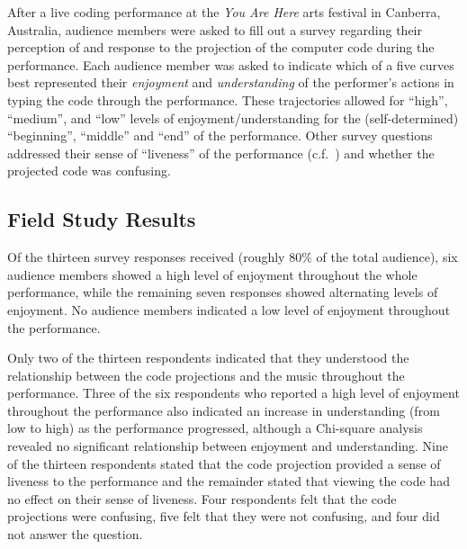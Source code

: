 \documentclass{sig-alternate}
\begin{document}


After a live coding performance at the \emph{You Are Here} arts
festival in Canberra, Australia, audience members were asked to fill
out a survey regarding their perception of and response to the
projection of the computer code during the performance. Each audience
member was asked to indicate which of a five curves best represented
their \emph{enjoyment} and \emph{understanding} of the performer's
actions in typing the code through the performance. These trajectories
allowed for ``high'', ``medium'', and ``low'' levels of
enjoyment/understanding for the (self-determined) ``beginning'',
``middle'' and ``end'' of the performance. Other survey questions
addressed their sense of ``liveness'' of the performance
(c.f.~\cite{Auslander}) and whether the projected code was confusing.

\subsection{Field Study Results}

Of the thirteen survey responses received (roughly $80\%$ of the total
audience), six audience members showed a high level of enjoyment
throughout the whole performance, while the remaining seven responses
showed alternating levels of enjoyment. No audience members indicated
a low level of enjoyment throughout the performance.

Only two of the thirteen respondents indicated that they understood
the relationship between the code projections and the music throughout
the performance. Three of the six respondents who reported a high
level of enjoyment throughout the performance also indicated an
increase in understanding (from low to high) as the performance
progressed, although a Chi-square analysis revealed no significant
relationship between enjoyment and understanding. Nine of the thirteen
respondents stated that the code projection provided a sense of
liveness to the performance and the remainder stated that viewing the
code had no effect on their sense of liveness. Four respondents felt
that the code projections were confusing, five felt that they were not
confusing, and four did not answer the question.
\end{document}
